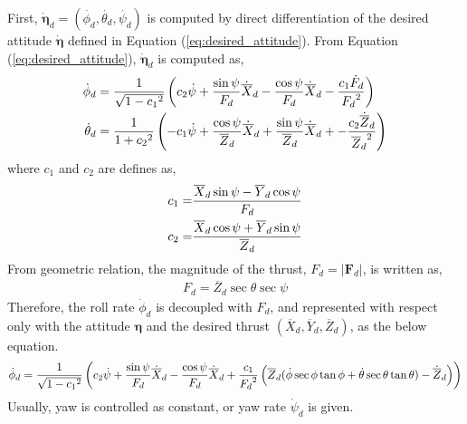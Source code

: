 First, \({\dot {\boldsymbol \eta}_d} = (\dot{\phi_d},\dot{ \theta_d}, \dot{\psi_d})\) is computed by direct differentiation of the desired attitude \({\dot {\boldsymbol \eta}}\) defined in Equation (\ref{eq:desired_attitude}). From Equation (\ref{eq:desired_attitude}), \({\dot {\boldsymbol \eta}_d}\) is computed as,
\begin{equation}
\begin{aligned}
\dot{\phi}_d & = {1 \over {\sqrt{1 - {c_1}^2}}} \left( c_2 \dot{\psi} + {\sin{\psi} \over F_d} \dot{{\overline X}}_d - {\cos{\psi} \over F_d} \dot{{\overline X}}_d  - {{c_1 \dot{F}_d} \over {{F_d}^2}} \right)\\
\dot{\theta}_d & = {1 \over {1 + {c_2}^2}} \left( - c_1 \dot{\psi} + {\cos{\psi} \over {{\overline Z}_d}} \dot{{\overline X}}_d + {\sin{\psi} \over {{\overline Z}}_d} \dot{{\overline X}}_d  +
- {{c_2 \dot{{\overline Z}}_d } \over {{{\overline Z}_d}^2}} \right)\\
\end{aligned}
\end{equation}
where \(c_1\) and \(c_2\) are defines as,
\begin{equation}
\begin{aligned}
c_1  = & {{{\overline X}_d} \sin{\psi} - {{\overline Y}_d} \cos{\psi}} \over {F_d}\\
c_2  = & {{{\overline X}_d} \cos{\psi} + {{\overline Y}_d} \sin{\psi}} \over {{\overline Z}_d}\\
\end{aligned}
\end{equation}
From geometric relation, the magnitude of the thrust, \(F_d = | {\boldsymbol F}_d | \), is written as,
\begin{equation}
\begin{aligned}
F_d = {{\overline Z}_d} \sec{\theta} \sec{\psi}
\end{aligned}
\end{equation}
Therefore, the roll rate \(\dot {\phi}_d\) is decoupled with \(F_d\), and represented with respect only with the attitude \(\boldsymbol \eta\) and the desired thrust \(({{\overline X}_d}, {{\overline Y}_d}, {{\overline Z}_d})\), as the below equation.
\begin{equation}
\begin{aligned}
\dot{\phi}_d & = {1 \over {\sqrt{1 - {c_1}^2}}} \left( c_2 \dot{\psi} + {\sin{\psi} \over F_d} \dot{{\overline X}}_d - {{\cos{\psi}} \over {F_d}} \dot{{{\overline X}}}_d  + {{c_1} \over {{F_d}^2}} \left({{\overline Z}_d} ( \dot{\phi} \sec{\phi} \tan{\phi}  + \dot{\theta} \sec{\theta} \tan{\theta} ) - \dot{{\overline Z}}_d \right) \right)\\
\end{aligned}
\end{equation}
Usually, yaw is controlled as constant, or yaw rate \(\dot{\psi}_d\) is given.

